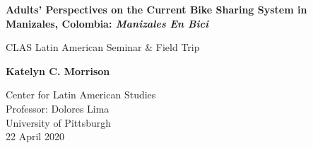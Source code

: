 \begin{titlepage}
    \begin{center}
        \vspace*{1cm}
        
        \LARGE
        \textbf{Adults' Perspectives on the Current Bike Sharing System in Manizales, Colombia: \textit{Manizales En Bici}}
        
        \vspace{0.5cm}
        \Large
        CLAS Latin American Seminar \& Field Trip
        
        \vspace{1.5cm}
        
        \textbf{Katelyn C. Morrison}
        
        \vspace{5cm}
        
        \large
        Center for Latin American Studies\\
        Professor: Dolores Lima\\
        University of Pittsburgh\\
        22 April 2020
        
    \end{center}
\end{titlepage}